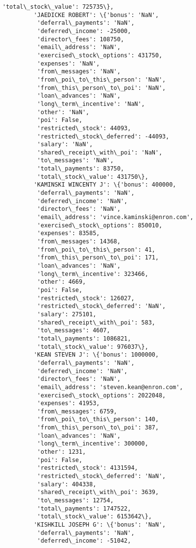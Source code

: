 \documentclass[11pt]{article}
\begin{document}
\begin{Verbatim}[commandchars=\\\{\}]
          'total\_stock\_value': 725735\},
         'JAEDICKE ROBERT': \{'bonus': 'NaN',
          'deferral\_payments': 'NaN',
          'deferred\_income': -25000,
          'director\_fees': 108750,
          'email\_address': 'NaN',
          'exercised\_stock\_options': 431750,
          'expenses': 'NaN',
          'from\_messages': 'NaN',
          'from\_poi\_to\_this\_person': 'NaN',
          'from\_this\_person\_to\_poi': 'NaN',
          'loan\_advances': 'NaN',
          'long\_term\_incentive': 'NaN',
          'other': 'NaN',
          'poi': False,
          'restricted\_stock': 44093,
          'restricted\_stock\_deferred': -44093,
          'salary': 'NaN',
          'shared\_receipt\_with\_poi': 'NaN',
          'to\_messages': 'NaN',
          'total\_payments': 83750,
          'total\_stock\_value': 431750\},
         'KAMINSKI WINCENTY J': \{'bonus': 400000,
          'deferral\_payments': 'NaN',
          'deferred\_income': 'NaN',
          'director\_fees': 'NaN',
          'email\_address': 'vince.kaminski@enron.com',
          'exercised\_stock\_options': 850010,
          'expenses': 83585,
          'from\_messages': 14368,
          'from\_poi\_to\_this\_person': 41,
          'from\_this\_person\_to\_poi': 171,
          'loan\_advances': 'NaN',
          'long\_term\_incentive': 323466,
          'other': 4669,
          'poi': False,
          'restricted\_stock': 126027,
          'restricted\_stock\_deferred': 'NaN',
          'salary': 275101,
          'shared\_receipt\_with\_poi': 583,
          'to\_messages': 4607,
          'total\_payments': 1086821,
          'total\_stock\_value': 976037\},
         'KEAN STEVEN J': \{'bonus': 1000000,
          'deferral\_payments': 'NaN',
          'deferred\_income': 'NaN',
          'director\_fees': 'NaN',
          'email\_address': 'steven.kean@enron.com',
          'exercised\_stock\_options': 2022048,
          'expenses': 41953,
          'from\_messages': 6759,
          'from\_poi\_to\_this\_person': 140,
          'from\_this\_person\_to\_poi': 387,
          'loan\_advances': 'NaN',
          'long\_term\_incentive': 300000,
          'other': 1231,
          'poi': False,
          'restricted\_stock': 4131594,
          'restricted\_stock\_deferred': 'NaN',
          'salary': 404338,
          'shared\_receipt\_with\_poi': 3639,
          'to\_messages': 12754,
          'total\_payments': 1747522,
          'total\_stock\_value': 6153642\},
         'KISHKILL JOSEPH G': \{'bonus': 'NaN',
          'deferral\_payments': 'NaN',
          'deferred\_income': -51042,

\end{Verbatim}
\end{document}
